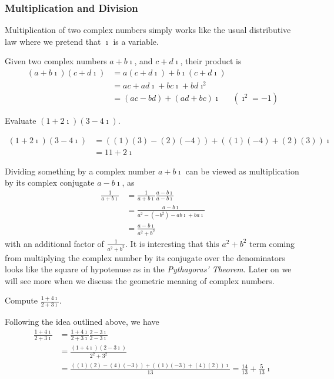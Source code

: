 \subsubsection{Multiplication and Division}
Multiplication of two complex numbers simply works like the usual distributive law where we pretend that $\imath$ is a variable.
\begin{defn}
Given two complex numbers $a + b\imath$, and $c + d\imath$, their product is
\begin{align*}
(a + b\imath)(c + d\imath) &= a(c + d\imath) + b\imath(c + d\imath)\\
&= ac + ad\imath + bc\imath + bd\imath^2 \\
&= (ac - bd) + (ad + bc)\imath & (\imath^2 = -1)
\end{align*}
\end{defn}

\begin{exmp}
Evaluate $(1+2\imath)(3-4\imath)$.
\end{exmp}
\begin{solution}
\begin{align*}
(1+2\imath)(3-4\imath) &= ((1)(3) - (2)(-4)) + ((1)(-4) + (2)(3))\imath \\
&= 11 + 2\imath
\end{align*}
\end{solution}

Dividing something by a complex number $a+b\imath$ can be viewed as multiplication by its complex conjugate $a-b\imath$, as
\begin{align*}
\frac{1}{a+b\imath} &= \frac{1}{a+b\imath}\frac{a-b\imath}{a-b\imath} \\
&= \frac{a-b\imath}{a^2 - (-b^2) - ab\imath + ba\imath} \\
&= \frac{a-b\imath}{a^2 + b^2}
\end{align*}
with an additional factor of $\frac{1}{a^2+b^2}$. It is interesting that this $a^2+b^2$ term coming from multiplying the complex number by its conjugate over the denominators looks like the square of hypotenuse as in the \textit{Pythagoras' Theorem}. Later on we will see more when we discuss the geometric meaning of complex numbers.

\begin{exmp}
Compute $\frac{1+4\imath}{2+3\imath}$.
\end{exmp}
\begin{solution}
Following the idea outlined above, we have
\begin{align*}
\frac{1+4\imath}{2+3\imath} &= \frac{1+4\imath}{2+3\imath}\frac{2-3\imath}{2-3\imath} \\
&= \frac{(1+4\imath)(2-3\imath)}{2^2+3^2} \\
&= \frac{((1)(2) - (4)(-3)) + ((1)(-3) + (4)(2))\imath}{13} = \frac{14}{13}+\frac{5}{13}\imath
\end{align*}
\end{solution}

